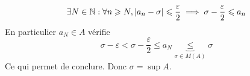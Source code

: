 \documentclass{article}
\renewenvironment{question_kholle}[2][ ]
{
	\subsection{\texorpdfstring{#2}{}}
	\notblank{#1}
	{
		\noindent #1
		\bigbreak
	}
	{}
	\begin{proof}
}
{
	\end{proof}
}
\begin{document}
\begin{question_kholle}
\begin{itemize}[label=$\star$]
\begin{itemize}[label=$\bullet$]
			            $$
				            \exists N \in \mathbb N :
				            \forall n \geqslant N,
				            \lvert a_{n} - \sigma
				            \rvert  \leqslant
				            \frac{\varepsilon}{2}
				            \implies \sigma -
				            \frac{\varepsilon}{2}\leqslant
				            a_{n}
			            $$
			            En particulier $a_{N}
				            \in A$ vérifie
			            $$
				            \sigma - \varepsilon <
				            \sigma -
				            \frac{\varepsilon}{2}
				            \leqslant a_{N}
				            \underbrace{ \leqslant
				            }_{ \sigma \in M(A) } \sigma
			            $$
			            Ce qui permet de conclure.
			            Donc $\sigma = \sup A$.
		      \end{itemize}
	\end{itemize}
\end{question_kholle}
\end{document}
